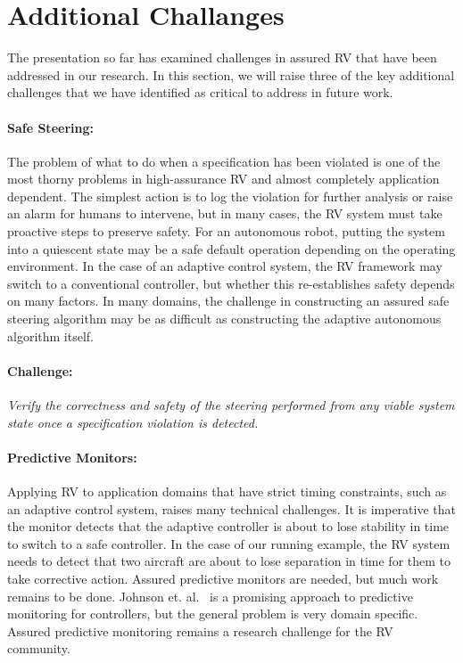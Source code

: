 \section{Additional Challanges }\label{sec:future} 
The presentation so far has examined challenges in assured RV that
have been addressed in our research. In this section, we will
raise three of the key additional challenges that we have identified
as critical to address in future work.

\paragraph{Safe Steering:} The problem of what to do when a
specification has been violated is one of the most thorny problems in
high-assurance RV and almost completely application dependent. The
simplest action is to log the violation for further analysis or raise
an alarm for humans to intervene, but in many cases, the RV system must
take proactive steps to preserve safety. For an autonomous robot,
putting the system into a quiescent state may be a safe default
operation depending on the operating environment.  In the case of an
adaptive control system, the RV framework may switch to a conventional
controller, but whether this re-establishes safety depends on many
factors.  In many domains, the challenge in constructing an assured
safe steering algorithm may be as difficult as constructing the
adaptive autonomous algorithm itself.

\paragraph{Challenge:}  \emph{Verify the correctness and safety of the
steering performed  from any viable system state once a specification violation is detected.}
 

\paragraph{Predictive Monitors:} Applying RV to application domains
that have strict timing constraints, such as an adaptive control
system, raises many technical challenges.  It is imperative that the
monitor detects that the adaptive controller is about to lose
stability in time to switch to a safe controller. In the case of our
running example, the RV system needs to detect that two aircraft are
about to lose separation in time for them to take corrective action.
Assured predictive monitors are needed, but much work remains to be
done.  Johnson et. al.~\cite{johnson2015tecs} is a promising approach
to predictive monitoring for controllers, but the general problem is
very domain specific. Assured predictive monitoring remains a research
challenge for the RV community.

